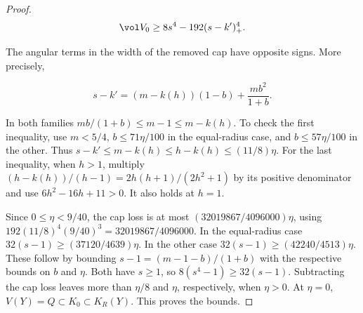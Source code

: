 \begin{proof}
\[
\vol V_0\ge 8s^4-192(s-k')_+^4.
\]

The angular terms in the width of the removed cap have opposite signs. More precisely,

\[
s-k'=(m-k(h))(1-b)+\frac{mb^2}{1+b}.
\]

In both families $mb/(1+b)\le m-1\le m-k(h)$. To check the first inequality, use $m<5/4$,
$b\le71\eta/100$ in the equal-radius case, and $b\le57\eta/100$ in the other. Thus
$s-k'\le m-k(h)\le h-k(h)\le(11/8)\eta$. For the last inequality, when $h>1$, multiply
$(h-k(h))/(h-1)=2h(h+1)/(2h^2+1)$ by its positive denominator and use $6h^2-16h+11>0$. It
also holds at $h=1$.

Since $0\le\eta<9/40$, the cap loss is at most $(32019867/4096000)\eta$, using
$192(11/8)^4(9/40)^3=32019867/4096000$. In the equal-radius case
$32(s-1)\ge(37120/4639)\eta$. In the other case $32(s-1)\ge(42240/4513)\eta$. These follow
by bounding $s-1=(m-1-b)/(1+b)$ with the respective bounds on $b$ and $\eta$. Both have
$s\ge1$, so $8(s^4-1)\ge32(s-1)$. Subtracting the cap loss leaves more than $\eta/8$ and
$\eta$, respectively, when $\eta>0$. At $\eta=0$, $V(Y)=Q\subset K_0\subset K_R(Y)$. This
proves the bounds.
\end{proof}

